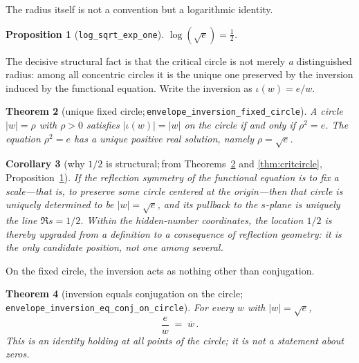 \documentclass[submission]{jsfds}
\newtheorem{theorem}{Theorem}
\newtheorem{proposition}[theorem]{Proposition}
\newtheorem{corollary}[theorem]{Corollary}
\newcommand{\Lean}[1]{\texttt{#1}}
\newcommand{\abs}[1]{\lvert #1\rvert}
\begin{document}
The radius itself is not a convention but a logarithmic identity.

\begin{proposition}[\Lean{log_sqrt_exp_one}]\label{prop:logsqrt}
$\log(\sqrt{e}) = \tfrac12$.
\end{proposition}

The decisive structural fact is that the critical circle is not merely
\emph{a} distinguished radius: among all concentric circles it is the unique
one preserved by the inversion induced by the functional equation. Write the
inversion as $\iota(w)=e/w$.

\begin{theorem}[unique fixed circle;\,\Lean{envelope_inversion_fixed_circle}]
\label{thm:fixedcircle}
A circle $\abs{w}=\rho$ with $\rho>0$ satisfies
$\abs{\iota(w)}=\abs{w}$ on the circle if and only if $\rho^{2}=e$. The
equation $\rho^{2}=e$ has a unique positive real solution, namely
$\rho=\sqrt{e}$.
\end{theorem}

\begin{corollary}[why $1/2$ is structural;\,from
Theorems~\ref{thm:fixedcircle} and \ref{thm:critcircle},
Proposition~\ref{prop:logsqrt}]\label{cor:onesecond}
If the reflection symmetry of the functional equation is to fix a scale---that
is, to preserve some circle centered at the origin---then that circle is
uniquely determined to be $\abs{w}=\sqrt{e}$, and its pullback to the $s$-plane
is uniquely the line $\Re s=1/2$. Within the hidden-number coordinates, the
location $1/2$ is thereby upgraded from a definition to a consequence of
reflection geometry: it is the only candidate position, not one among several.
\end{corollary}

On the fixed circle, the inversion acts as nothing other than conjugation.

\begin{theorem}[inversion equals conjugation on the circle;\,
\Lean{envelope_inversion_eq_conj_on_circle}]\label{thm:invconj}
For every $w$ with $\abs{w}=\sqrt{e}$,
\[
  \frac{e}{w} \;=\; \overline{w}\, .
\]
This is an identity holding at \emph{all} points of the circle; it is not a
statement about zeros.
\end{theorem}
\end{document}
